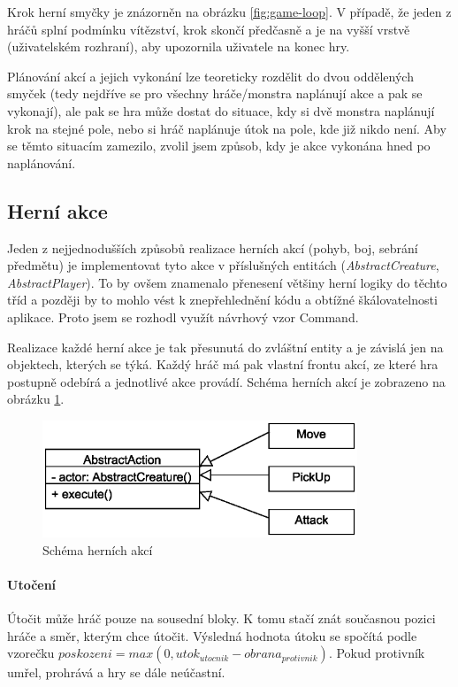 \documentclass[11pt,a4paper]{scrartcl}
\begin{document}
	Krok herní smyčky je znázorněn na obrázku \ref{fig:game-loop}. V případě, že jeden z hráčů splní podmínku vítězství, krok skončí předčasně a je na vyšší vrstvě (uživatelském rozhraní), aby upozornila uživatele na konec hry.
	
	Plánování akcí a jejich vykonání lze teoreticky rozdělit do dvou oddělených smyček (tedy nejdříve se pro všechny hráče/monstra naplánují akce a pak se vykonají), ale pak se hra může dostat do situace, kdy si dvě monstra naplánují krok na stejné pole, nebo si hráč naplánuje útok na pole, kde již nikdo není. Aby se těmto situacím zamezilo, zvolil jsem způsob, kdy je akce vykonána hned po naplánování.
	
	
	\subsection{Herní akce}
	Jeden z nejjednodušších způsobů realizace herních akcí (pohyb, boj, sebrání předmětu) je implementovat tyto akce v příslušných entitách (\textit{AbstractCreature}, \textit{AbstractPlayer}). To by ovšem znamenalo přenesení většiny herní logiky do těchto tříd a později by to mohlo vést k znepřehlednění kódu a obtížné škálovatelnosti aplikace. Proto jsem se rozhodl využít návrhový vzor Command.
	
	Realizace každé herní akce je tak přesunutá do zvláštní entity a je závislá jen na objektech, kterých se týká. Každý hráč má pak vlastní frontu akcí, ze které hra postupně odebírá a jednotlivé akce provádí. Schéma herních akcí je zobrazeno na obrázku \ref{fig:game-act}.
	
	\begin{figure}[H]
		\centering
		\includegraphics[height=35mm]{core-game-actions-simple}
		\caption{Schéma herních akcí}
		\label{fig:game-act}
	\end{figure} 
	
	\paragraph{Utočení} Útočit může hráč pouze na sousední bloky. K tomu stačí znát současnou pozici hráče a směr, kterým chce útočit. Výsledná hodnota útoku se spočítá podle vzorečku $poskozeni=max(0,utok_{utocnik} - obrana_{protivnik})$. Pokud protivník umřel, prohrává a hry se dále neúčastní.
	
\end{document}
